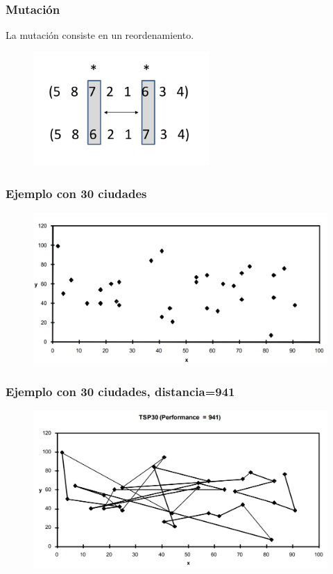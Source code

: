 \documentclass[10pt]{beamer}
\begin{document}
\begin{frame}
  \frametitle{Mutación}

  La mutación consiste en un reordenamiento.

  \begin{figure}[!h] 
    \centering
    \includegraphics[width=0.6\textwidth]{img/mut2}
  \end{figure}

\end{frame}

\begin{frame}
  \frametitle{Ejemplo con 30 ciudades}

  \begin{figure}[!h] 
    \centering
    \includegraphics[width=1\textwidth]{img/tsp1}
  \end{figure}

\end{frame}

\begin{frame}
  \frametitle{Ejemplo con 30 ciudades, distancia=941}

  \begin{figure}[!h] 
    \centering
    \includegraphics[width=1\textwidth]{img/tsp2}
  \end{figure}

\end{frame}
\end{document}
